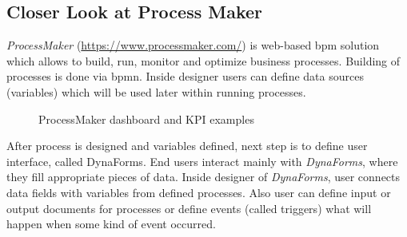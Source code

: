  \subsection{Closer Look at Process Maker}
 
 \textit{ProcessMaker} (\href{https://www.processmaker.com/}{https://www.processmaker.com/}) is web-based \gls{bpm} solution which allows to build, run, monitor and optimize business processes. Building of processes is done via \gls{bpmn}. Inside designer %
 users can define data sources (variables) which will be used later within running processes. 
 
 
\begin{figure}[ht!]
    \centering
    \qquad
    \caption{ProcessMaker dashboard and KPI examples}%
    \label{fig:process-maker-dashboard}%
\end{figure}

 After process is designed and variables defined, next step is to define user interface, called DynaForms. End users interact mainly with \textit{DynaForms}, where they fill appropriate pieces of data. 
 Inside designer of \textit{DynaForms}, user connects data fields with variables from defined processes. Also user can define input or output documents for processes or define events (called triggers) what will happen when some kind of event occurred.
 
